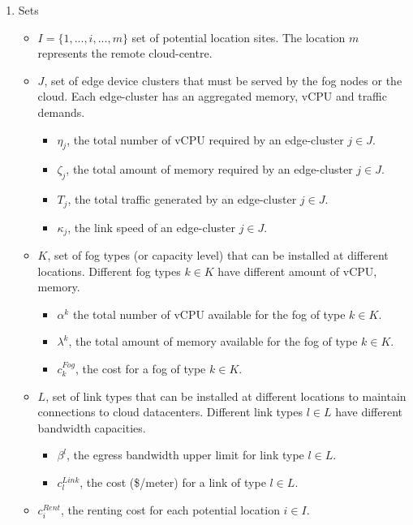 \documentclass[10pt,journal,compsoc]{IEEEtran}
\begin{document}
\begin{enumerate}
\item Sets
\begin{itemize}
\item $ \textit{I} = \{ 1,...,i,...,m \} $ set of potential location sites. The location $m$ represents the remote cloud-centre.
\item $\textit{J}$, set of edge device clusters that must be served by the fog nodes or the cloud. Each edge-cluster has an aggregated memory, vCPU and traffic demands.
\begin{itemize}
\item $\eta_j$, the total number of vCPU required by an edge-cluster $j \in J$.
\item $\zeta_j$, the total amount of memory required by an edge-cluster $j \in J$.
\item $T_j$, the total traffic generated by an edge-cluster $j \in J$.
\item $\kappa_j$, the link speed of an edge-cluster $j \in J$.
\end{itemize}

\item $K$, set of fog types (or capacity level) that can be installed at different locations. Different fog types $k \in K$ have different amount of vCPU, memory.
\begin{itemize}
\item $\alpha^k$ the total number of vCPU available for the fog of type $k \in K$.
\item $\lambda^k$, the total amount of memory available for the fog of type $k \in K$.
\item $c_k^{Fog}$, the cost for a fog of type $k \in K$.
\end{itemize} 
\item $L$, set of link types that can be installed at different locations to maintain connections to cloud datacenters. Different link types $l \in L$ have different bandwidth capacities. 
\begin{itemize}
\item $\beta^l$, the egress bandwidth upper limit for link type $l \in L$.
\item $c_l^{Link}$, the cost (\$/meter) for a link of type $l \in L$.
\end{itemize}
\item $c_i^{Rent}$, the renting cost for each potential location $i \in I$.
\end{itemize}



\end{enumerate}
\end{document}
